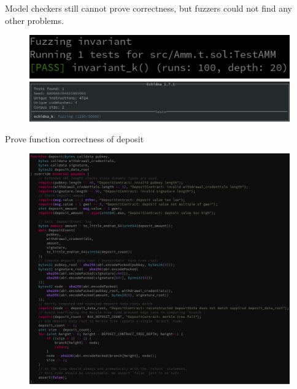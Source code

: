 \documentclass[aspectratio=169,10pt]{beamer}
\begin{document}
\begin{frame}[fragile]
\begin{center}
Model checkers still cannot prove correctness, but fuzzers could not find any other problems.
\begin{figure}
\includegraphics[scale=0.35]{images/amm_pass_hevm_run}
\includegraphics[scale=0.35]{images/amm_pass_echidna_run}
\end{figure}
\end{center}
\end{frame}

\begin{frame}[fragile]
\begin{center}
Prove function correctness of deposit
\begin{figure}
	\includegraphics[scale=0.25]{images/deposit_pass}
\end{figure}
\end{center}
\end{frame}
\end{document}
